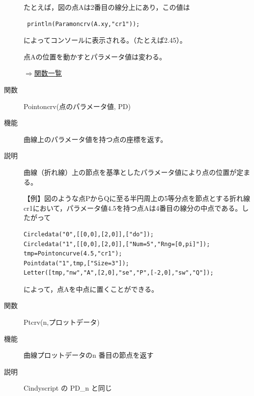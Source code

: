 \documentclass[papersize,a4paper,10pt,uplatex]{jsarticle}
\begin{document}
\begin{description}
たとえば，図の点$\mathrm{A}$は2番目の線分上にあり，この値は

\begin{verbatim}
 println(Paramoncrv(A.xy,"cr1"));
\end{verbatim}

によってコンソールに表示される。（たとえば2.45）。

点Aの位置を動かすとパラメータ値は変わる。

\vspace{\baselineskip}
\begin{center}
 
\end{center}

\begin{flushright}\hyperlink{functionlist}{$\Rightarrow$関数一覧}\end{flushright}


\vspace{\baselineskip}
\hypertarget{pointoncrv}{}
\item[関数]Pointoncrv(点のパラメータ値, PD)
\item[機能]曲線上のパラメータ値を持つ点の座標を返す。
\item[説明]曲線（折れ線）上の節点を基準としたパラメータ値により点の位置が定まる。

\vspace{\baselineskip}
【例】図のような点$\mathrm{P}$から$\mathrm{Q}$に至る半円周上の5等分点を節点とする折れ線cr1において，パラメータ値$4.5$を持つ点$\mathrm{A}$は4番目の線分の中点である。したがって

\begin{verbatim}
Circledata("0",[[0,0],[2,0]],["do"]);
Circledata("1",[[0,0],[2,0]],["Num=5","Rng=[0,pi]"]);
tmp=Pointoncurve(4.5,"cr1");
Pointdata("1",tmp,["Size=3"]);
Letter([tmp,"nw","A",[2,0],"se","P",[-2,0],"sw","Q"]);
\end{verbatim}

によって，点Aを中点に置くことができる。

\vspace{\baselineskip}
 \begin{center} \scalebox{0.9}{} \end{center}

\hypertarget{ptcrv}{}
\item[関数]Ptcrv(n,プロットデータ)
\item[機能]曲線プロットデータのn 番目の節点を返す
\item[説明]Cindyscript の PD\_n と同じ


\end{description}
\end{document}

